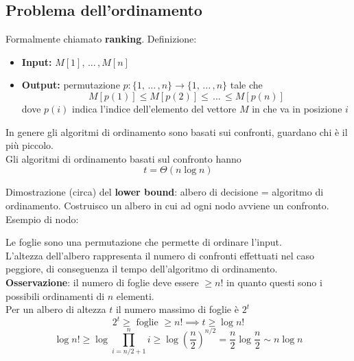 \newpage

\subsection{Problema dell'ordinamento}

Formalmente chiamato \textbf{ranking}. Definizione:
\begin{itemize}
	\item \textbf{Input:} $M[1], \, ... \, , M[n]$
	
	\item \textbf{Output:} permutazione $p: \{1, \, ... \, , n\} \rightarrow \{1, \, ... \, , n\}$ tale che
	$$ M[p(1)] \leq M[p(2)] \leq \, ... \, \leq M[p(n)] $$
	dove $p(i)$ indica l'indice dell'elemento del vettore $M$ in che va in posizione $i$
\end{itemize}

In genere gli algoritmi di ordinamento sono basati sui confronti, guardano chi è il più piccolo.\\
Gli algoritmi di ordinamento basati sul confronto hanno 
$$ t = \Theta (n \log n) $$

Dimostrazione (circa) del \textbf{lower bound}: albero di decisione = algoritmo di ordinamento. Costruisco un albero in cui ad ogni nodo avviene un confronto.\\
Esempio di nodo: 
\begin{center}
\end{center}

Le foglie sono una permutazione che permette di ordinare l'input.\\
L'altezza dell'albero rappresenta il numero di confronti effettuati nel caso peggiore, di conseguenza il tempo dell'algoritmo di ordinamento.\\

\textbf{Osservazione}: il numero di foglie deve essere $\geq n!$ in quanto questi sono i possibili ordinamenti di $n$ elementi.\\
Per un albero di altezza $t$ il numero massimo di foglie è $2^t$
$$ 2^t \geq \text{ foglie } \geq n! \implies t \geq \log n! $$
$$ \log n! \geq \log \prod_{i = n/2 + 1}^n i \geq \log \left(\frac{n}{2}\right)^{n/2} = \frac{n}{2} \log \frac{n}{2} \sim n \log n $$

